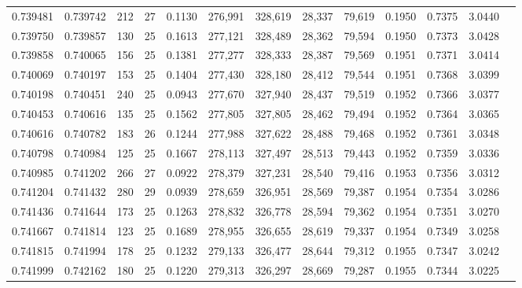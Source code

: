 \begin{tabular}{rrrrrrrrrrrrr}
0.739481 & 0.739742 &   212 &  27 &                                     0.1130 & 276,991 & 328,619 &  28,337 &  79,619 & 0.1950 & 0.7375 & 3.0440 \\
0.739750 & 0.739857 &   130 &  25 &                                     0.1613 & 277,121 & 328,489 &  28,362 &  79,594 & 0.1950 & 0.7373 & 3.0428 \\
0.739858 & 0.740065 &   156 &  25 &                                     0.1381 & 277,277 & 328,333 &  28,387 &  79,569 & 0.1951 & 0.7371 & 3.0414 \\
0.740069 & 0.740197 &   153 &  25 &                                     0.1404 & 277,430 & 328,180 &  28,412 &  79,544 & 0.1951 & 0.7368 & 3.0399 \\
0.740198 & 0.740451 &   240 &  25 &                                     0.0943 & 277,670 & 327,940 &  28,437 &  79,519 & 0.1952 & 0.7366 & 3.0377 \\
0.740453 & 0.740616 &   135 &  25 &                                     0.1562 & 277,805 & 327,805 &  28,462 &  79,494 & 0.1952 & 0.7364 & 3.0365 \\
0.740616 & 0.740782 &   183 &  26 &                                     0.1244 & 277,988 & 327,622 &  28,488 &  79,468 & 0.1952 & 0.7361 & 3.0348 \\
0.740798 & 0.740984 &   125 &  25 &                                     0.1667 & 278,113 & 327,497 &  28,513 &  79,443 & 0.1952 & 0.7359 & 3.0336 \\
0.740985 & 0.741202 &   266 &  27 &                                     0.0922 & 278,379 & 327,231 &  28,540 &  79,416 & 0.1953 & 0.7356 & 3.0312 \\
0.741204 & 0.741432 &   280 &  29 &                                     0.0939 & 278,659 & 326,951 &  28,569 &  79,387 & 0.1954 & 0.7354 & 3.0286 \\
0.741436 & 0.741644 &   173 &  25 &                                     0.1263 & 278,832 & 326,778 &  28,594 &  79,362 & 0.1954 & 0.7351 & 3.0270 \\
0.741667 & 0.741814 &   123 &  25 &                                     0.1689 & 278,955 & 326,655 &  28,619 &  79,337 & 0.1954 & 0.7349 & 3.0258 \\
0.741815 & 0.741994 &   178 &  25 &                                     0.1232 & 279,133 & 326,477 &  28,644 &  79,312 & 0.1955 & 0.7347 & 3.0242 \\
0.741999 & 0.742162 &   180 &  25 &                                     0.1220 & 279,313 & 326,297 &  28,669 &  79,287 & 0.1955 & 0.7344 & 3.0225 \\

\end{tabular}

